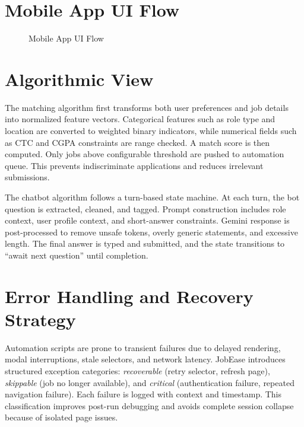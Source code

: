 \documentclass[12pt,a4paper,oneside]{report}
\begin{document}
\section{Mobile App UI Flow}
\begin{figure}[H]
\centering
{}
\caption{Mobile App UI Flow}
\end{figure}

\section{Algorithmic View}
The matching algorithm first transforms both user preferences and job details into normalized feature vectors. Categorical features such as role type and location are converted to weighted binary indicators, while numerical fields such as CTC and CGPA constraints are range checked. A match score is then computed. Only jobs above configurable threshold are pushed to automation queue. This prevents indiscriminate applications and reduces irrelevant submissions.

The chatbot algorithm follows a turn-based state machine. At each turn, the bot question is extracted, cleaned, and tagged. Prompt construction includes role context, user profile context, and short-answer constraints. Gemini response is post-processed to remove unsafe tokens, overly generic statements, and excessive length. The final answer is typed and submitted, and the state transitions to ``await next question'' until completion.

\section{Error Handling and Recovery Strategy}
Automation scripts are prone to transient failures due to delayed rendering, modal interruptions, stale selectors, and network latency. JobEase introduces structured exception categories: \textit{recoverable} (retry selector, refresh page), \textit{skippable} (job no longer available), and \textit{critical} (authentication failure, repeated navigation failure). Each failure is logged with context and timestamp. This classification improves post-run debugging and avoids complete session collapse because of isolated page issues.
\end{document}
